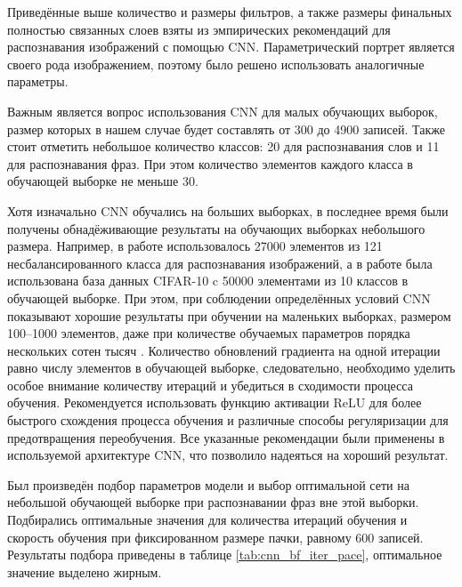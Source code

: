 Приведённые выше количество и размеры фильтров, а также размеры финальных полностью связанных слоев взяты из эмпирических рекомендаций для распознавания изображений с помощью CNN.
Параметрический портрет является своего рода изображением, поэтому было решено использовать аналогичные параметры.

Важным является вопрос использования CNN для малых обучающих выборок, размер которых в нашем случае будет составлять от 300 до 4900 записей.
Также стоит отметить небольшое количество классов: 20 для распознавания слов и 11 для распознавания фраз.
При этом количество элементов каждого класса в обучающей выборке не меньше 30.

Хотя изначально CNN обучались на больших выборках, в последнее время были получены обнадёживающие результаты на обучающих выборках небольшого размера.
Например, в работе \cite{dieleman2015classifying} использовалось 27000 элементов из 121 несбалансированного класса для распознавания изображений, а в работе \cite{truong2018lightweight} была использована база данных CIFAR-10 \cite{cifar10} c 50000 элементами из 10 классов в обучающей выборке.
При этом, при соблюдении определённых условий CNN показывают хорошие результаты при обучении на маленьких выборках, размером 100--1000 элементов, даже при количестве обучаемых параметров порядка нескольких сотен тысяч \cite{beam2017cnn}.
Количество обновлений градиента на одной итерации равно числу элементов в обучающей выборке, следовательно, необходимо уделить особое внимание количеству итераций и убедиться в сходимости процесса обучения.
Рекомендуется использовать функцию активации ReLU для более быстрого схождения процесса обучения и различные способы регуляризации для предотвращения переобучения.
Все указанные рекомендации были применены в используемой архитектуре CNN, что позволило надеяться на хороший результат.

Был произведён подбор параметров модели и выбор оптимальной сети на небольшой обучающей выборке при распознавании фраз вне этой выборки.
Подбирались оптимальные значения для количества итераций обучения и скорость обучения при фиксированном размере пачки, равному 600 записей.
Результаты подбора приведены в таблице \ref{tab:cnn_bf_iter_pace}, оптимальное значение выделено жирным.

